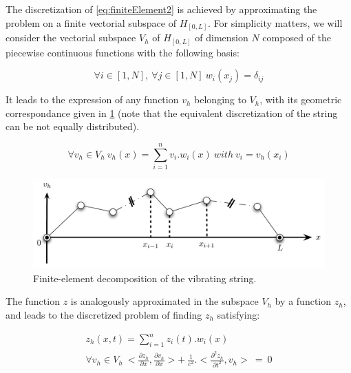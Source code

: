 {{The discretization of \myequname \eqref{eq:finiteElement2} is achieved by approximating the problem on a finite vectorial subspace of $H_{[0, L]}$. For simplicity matters, we will consider the vectorial subspace $V_h$ of $H_{[0, L]}$ of dimension $N$ composed of the piecewise continuous functions with the following basis:

$$
	\forall i \in [1, N],\ \forall j \in [1, N]\ w_i(x_j) = \delta_{ij}  \nonumber
$$

It leads to the expression of any function $v_h$ belonging to $V_h$, with its geometric correspondance given in \myfigname \ref{fig:finiteElement1} (note that the equivalent discretization of the string can be not equally distributed).

\begin{equation}
	\forall v_h \in V_h\ v_h(x) = \sum_{i=1}^{n} v_i . w_i(x)\ with\ v_i = v_h(x_i) \label{eq:finiteElement3}
\end{equation}

\begin{figure}[H]
	\begin{center}
		\includegraphics[width=\textwidth]{Appendices/A/Pics/Pdf/FiniteElement1.pdf}
	\end{center}
	\vspace{-0.5cm}
	\caption[Finite-element decomposition of the vibrating string]{Finite-element decomposition of the vibrating string.}
	\label{fig:finiteElement1}
\end{figure}

The function $z$ is analogously approximated in the subspace $V_h$ by a function $z_h$, and leads to the discretized problem of finding $z_h$ satisfying:

\begin{eqnarray}
	z_h(x, t) = \sum_{i=1}^{n} z_i(t) . w_i(x) \label{eq:finiteElement4} \\
	\forall v_h \in V_h\ <\frac{\partial z_h}{\partial x}, \frac{\partial v_h}{\partial x}> +\ \frac{1}{c^2} . <\frac{\partial^2 z_h}{\partial t^2}, v_h>\ =\ 0 \label{eq:finiteElement5}
\end{eqnarray}

}}
